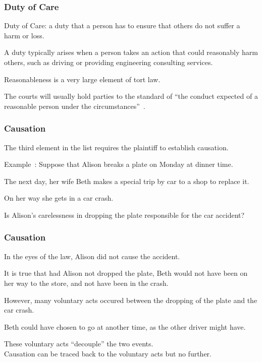 \begin{frame}
\frametitle{Duty of Care}

\alert{Duty of Care}: a duty that a person has to ensure that others do not suffer a harm or loss.

A duty typically arises when a person takes an action that could reasonably harm others, such as driving or providing engineering consulting services.

\alert{Reasonableness} is a very large element of tort law. 

The courts will usually hold parties to the standard of ``the conduct expected of a reasonable person under the circumstances''~\cite{lpe}.

\end{frame}



\begin{frame}
\frametitle{Causation}

The third element in the list requires the plaintiff to establish causation.

Example~\cite{lba}: Suppose that Alison breaks a plate on Monday at dinner time.

The next day, her wife Beth makes a special trip by car to a shop to replace it.

On her way she gets in a car crash.

Is Alison's carelessness in dropping the plate responsible for the car accident?

\end{frame}



\begin{frame}
\frametitle{Causation}

In the eyes of the law, Alison did not cause the accident.

It is true that had Alison not dropped the plate, Beth would not have been on her way to the store, and not have been in the crash.

However, many voluntary acts occured between the dropping of the plate and the car crash.

Beth could have chosen to go at another time, as the other driver might have.

These voluntary acts ``decouple'' the two events.\\
\quad Causation can be traced back to the voluntary acts but no further.

\end{frame}



